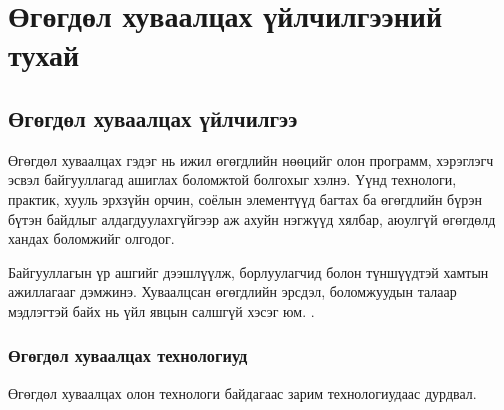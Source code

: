 
\chapter{Өгөгдөл хуваалцах үйлчилгээний тухай} %
\label{Chapter1} %
\pagecolor{white}

\newcommand{\keyword}[1]{\textbf{#1}}
\newcommand{\tabhead}[1]{\textbf{#1}}
\newcommand{\code}[1]{\texttt{#1}}
\newcommand{\file}[1]{\texttt{\bfseries#1}}
\newcommand{\option}[1]{\texttt{\itshape#1}}


\section{Өгөгдөл хуваалцах үйлчилгээ}
Өгөгдөл хуваалцах гэдэг нь ижил өгөгдлийн нөөцийг олон программ, хэрэглэгч эсвэл байгууллагад ашиглах боломжтой болгохыг хэлнэ.
Үүнд технологи, практик, хууль эрхзүйн орчин, соёлын элементүүд багтах ба өгөгдлийн бүрэн бүтэн байдлыг алдагдуулахгүйгээр аж ахуйн нэгжүүд хялбар, аюулгүй өгөгдөлд хандах боломжийг олгодог.

Байгууллагын үр ашгийг дээшлүүлж, борлуулагчид болон түншүүдтэй хамтын ажиллагааг дэмжинэ. Хуваалцсан өгөгдлийн эрсдэл, боломжуудын талаар мэдлэгтэй байх нь үйл явцын салшгүй хэсэг юм.
\cite{AWSDataSharing}.

\subsection{Өгөгдөл хуваалцах технологиуд}
Өгөгдөл хуваалцах олон технологи байдагаас зарим технологиудаас дурдвал.

